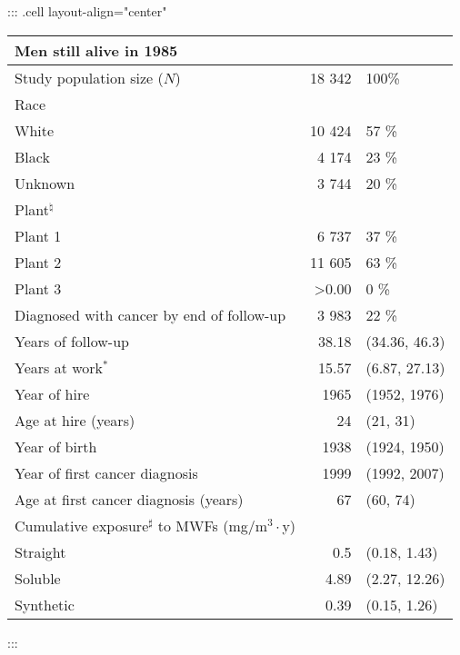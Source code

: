 \documentclass[
  11pt,
  letterpaper,
  DIV=11,
  numbers=noendperiod]{scrartcl}
\theoremstyle{remark}\newtheorem*{claim}{Claim}
\begin{document}
\begin{table}[H]
\centering
::: {.cell layout-align="center"}
\begin{tabular}{lrl}
  \toprule
\multicolumn{3}{l}{Men still alive in 1985}\\%
  \midrule
Study population size ($N$) & 18 342 & 100\% \\ 
  Race &  &  \\ 
  \hspace{10pt}White & 10 424 & 57 \% \\ 
  \hspace{10pt}Black & 4 174 & 23 \% \\ 
  \hspace{10pt}Unknown & 3 744 & 20 \% \\ 
  Plant$^\natural$ &  &  \\ 
  \hspace{10pt}Plant 1 & 6 737 & 37 \% \\ 
  \hspace{10pt}Plant 2 & 11 605 & 63 \% \\ 
  \hspace{10pt}Plant 3 & >0.00 & 0 \% \\ 
  Diagnosed with cancer by end of follow-up & 3 983 & 22 \% \\ 
  \hline Years of follow-up & 38.18 & (34.36, 46.3) \\ 
  Years at work$^*$ & 15.57 & (6.87, 27.13) \\ 
  Year of hire & 1965 & (1952, 1976) \\ 
  Age at hire (years) & 24 & (21, 31) \\ 
  Year of birth & 1938 & (1924, 1950) \\ 
  Year of first cancer diagnosis & 1999 & (1992, 2007) \\ 
  Age at first cancer diagnosis (years) & 67 & (60, 74) \\ 
  Cumulative exposure$^\sharp$ to MWFs (mg/m$^3\cdot$y) &  &  \\ 
  \hspace{10pt}Straight & 0.5 & (0.18, 1.43) \\ 
  \hspace{10pt}Soluble & 4.89 & (2.27, 12.26) \\ 
  \hspace{10pt}Synthetic & 0.39 & (0.15, 1.26) \\ 
   \bottomrule
\end{tabular}
:::
\end{table}
\end{document}
